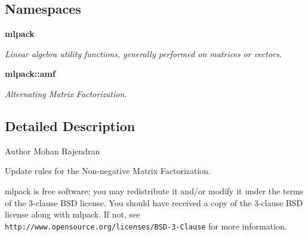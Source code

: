 \subsection*{Namespaces}
\begin{DoxyCompactItemize}
\item 
 {\bf mlpack}
\begin{DoxyCompactList}\small\item\em Linear algebra utility functions, generally performed on matrices or vectors. \end{DoxyCompactList}\item 
 {\bf mlpack\+::amf}
\begin{DoxyCompactList}\small\item\em Alternating Matrix Factorization. \end{DoxyCompactList}\end{DoxyCompactItemize}


\subsection{Detailed Description}
\begin{DoxyAuthor}{Author}
Mohan Rajendran
\end{DoxyAuthor}
Update rules for the Non-\/negative Matrix Factorization.

mlpack is free software; you may redistribute it and/or modify it under the terms of the 3-\/clause B\+SD license. You should have received a copy of the 3-\/clause B\+SD license along with mlpack. If not, see {\tt http\+://www.\+opensource.\+org/licenses/\+B\+S\+D-\/3-\/\+Clause} for more information. 